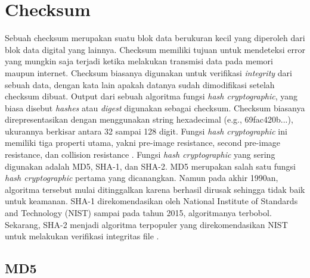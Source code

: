 \section{Checksum}
\label{sec:checksum}


Sebuah checksum merupakan suatu blok data berukuran kecil yang diperoleh dari blok data digital yang lainnya. Checksum memiliki tujuan untuk mendeteksi error yang mungkin saja terjadi ketika melakukan transmisi data pada memori maupun internet. Checksum biasanya digunakan untuk verifikasi \emph{integrity} dari sebuah data, dengan kata lain apakah datanya sudah dimodifikasi setelah checksum dibuat. Output dari sebuah algoritma fungsi \emph{hash cryptographic}, yang biasa disebut \emph{hashes} atau \emph{digest} digunakan sebagai checksum. Checksum biasanya direpresentasikan dengan menggunakan string hexadecimal (e.g., 69fac420b...), ukurannya berkisar antara 32 sampai 128 digit. Fungsi \emph{hash cryptographic} ini memiliki tiga properti utama, yakni pre-image resistance, second pre-image resistance, dan collision resistance \citep{bart1994}. Fungsi \emph{hash cryptographic} yang sering digunakan adalah MD5, SHA-1, dan SHA-2. MD5 merupakan salah satu fungsi \emph{hash cryptographic} pertama yang dicanangkan. Namun pada akhir 1990an, algoritma tersebut mulai ditinggalkan karena berhasil dirusak sehingga tidak baik untuk keamanan. SHA-1 direkomendasikan oleh National Institute of Standards and Technology (NIST) sampai pada tahun 2015, algoritmanya terbobol. Sekarang, SHA-2 menjadi algoritma terpopuler yang direkomendasikan NIST untuk melakukan verifikasi integritas file \citep{nistpolicy}.

\subsection{MD5}
\label{subsec:MD5}

